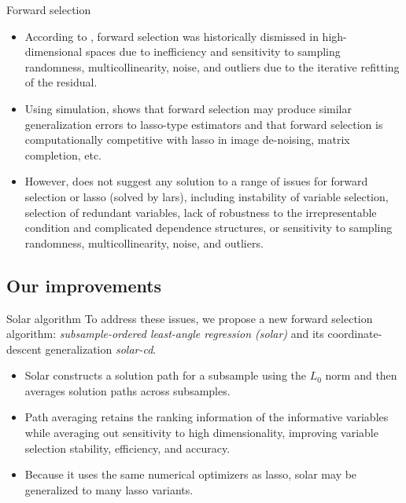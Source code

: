 \documentclass{beamer}
\begin{document}
\begin{frame}{Forward selection}
  \begin{itemize}
    \item According to \citet{friedman2001elements, weisberg04}, forward selection was historically dismissed in high-dimensional spaces due to inefficiency and sensitivity to sampling randomness, multicollinearity, noise, and outliers due to the iterative refitting of the residual.
    
    \item Using simulation, \citet{tibshirani2015general} shows that forward selection may produce similar generalization errors to lasso-type estimators and that forward selection is computationally competitive with lasso in image de-noising, matrix completion, etc.
    
    \item However, \citet{tibshirani2015general} does not suggest any solution to a range of issues for forward selection or lasso (solved by lars), including instability of variable selection, selection of redundant variables, lack of robustness to the irrepresentable condition and complicated dependence structures, or sensitivity to sampling randomness, multicollinearity, noise, and outliers.
  \end{itemize}
\end{frame}


\subsection{Our improvements}

\begin{frame}{Solar algorithm}
  To address these issues, we propose a new forward selection algorithm: \emph{subsample-ordered least-angle regression (solar)} and its coordinate-descent generalization \emph{solar-cd}.
  \begin{itemize}  
    \item Solar constructs a solution path for a subsample using the $L_0$ norm and then averages solution paths across subsamples.
     
    \item Path averaging retains the ranking information of the informative variables while averaging out sensitivity to high dimensionality, improving variable selection stability, efficiency, and accuracy. 
    
    \item Because it uses the same numerical optimizers as lasso, solar may be generalized to many lasso variants.
  \end{itemize}
\end{frame}
\end{document}
